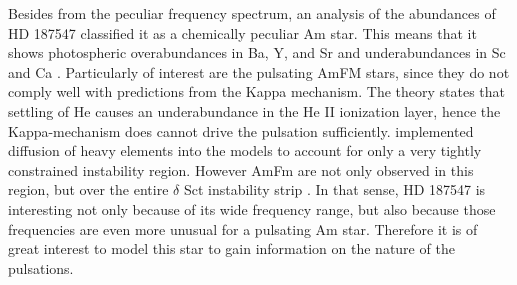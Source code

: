 Besides from the peculiar frequency spectrum, an analysis of the abundances of HD 187547 classified it as a chemically peculiar Am star. This means that it shows photospheric overabundances in Ba, Y, and Sr and underabundances in Sc and Ca \citep{preston1974chemically}. Particularly of interest are the pulsating AmFM stars, since they do not comply well with predictions from the Kappa mechanism. The theory states that settling of He causes an underabundance in the He II ionization layer, hence the Kappa-mechanism does cannot drive the pulsation sufficiently. \citet{turcotte2000} implemented diffusion of heavy elements into the models to account for only a very tightly constrained instability region. However AmFm are not only observed in this region, but over the entire $\delta$ Sct instability strip \citep{smalley2011superwasp, balona2011kepler}. In that sense, HD 187547 is interesting not only because of its wide frequency range, but also because those frequencies are even more unusual for a pulsating Am star. Therefore it is of great interest to model this star to gain information on the nature of the pulsations. 
\\


